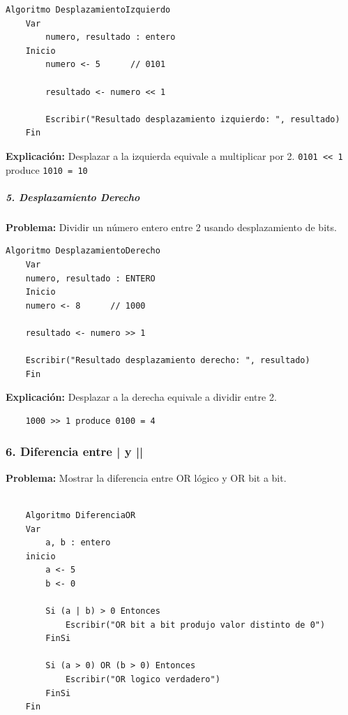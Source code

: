\documentclass[12pt,twoside]{book}
\begin{document}
						\begin{lstlisting}[style=upsamStyle,caption={Multiplicación entero por 2 con desplazamiento}]
	Algoritmo DesplazamientoIzquierdo
	Var
		numero, resultado : entero
	Inicio
		numero <- 5      // 0101
		
		resultado <- numero << 1
		
		Escribir("Resultado desplazamiento izquierdo: ", resultado)
	Fin \end{lstlisting}
						
						\noindent
						\textbf{Explicación:} Desplazar a la izquierda equivale a multiplicar por 2.  \texttt{0101 << 1} produce \texttt{1010 = 10}
						
						\subparagraph{5. Desplazamiento Derecho}
						
						\noindent
						\textbf{Problema:} Dividir un número entero entre 2 usando desplazamiento de bits.
						
						\begin{lstlisting}[style=upsamStyle,caption={Disión de enteros para 2 por desplazamiento}]
	Algoritmo DesplazamientoDerecho
	Var
	numero, resultado : ENTERO
	Inicio
	numero <- 8      // 1000
	
	resultado <- numero >> 1
	
	Escribir("Resultado desplazamiento derecho: ", resultado)
	Fin \end{lstlisting}
						
						\noindent
						\textbf{Explicación:} Desplazar a la derecha equivale a dividir entre 2.  
						\begin{lstlisting}
	1000 >> 1 produce 0100 = 4  \end{lstlisting}
						
						\subsubsection*{6. Diferencia entre | y ||}
						
						\textbf{Problema:}  
						Mostrar la diferencia entre OR lógico y OR bit a bit.
						
						\begin{lstlisting}[style=upsamStyle,caption={Diferencia entre OR bit a bit y OR lógico}]
	
	Algoritmo DiferenciaOR
	Var
		a, b : entero
	inicio
		a <- 5
		b <- 0
		
		Si (a | b) > 0 Entonces
			Escribir("OR bit a bit produjo valor distinto de 0")
		FinSi
		
		Si (a > 0) OR (b > 0) Entonces
			Escribir("OR logico verdadero")
		FinSi
	Fin \end{lstlisting}
						
\end{document}
